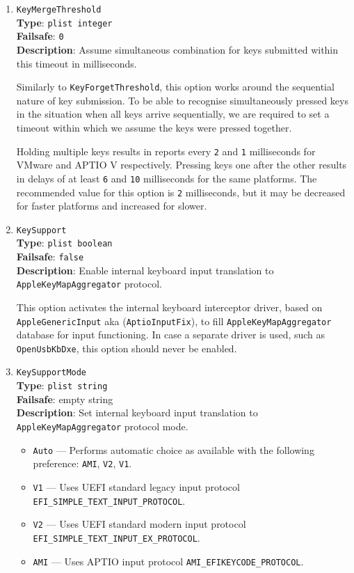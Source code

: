 \documentclass[]{article}
\providecommand{\tightlist}{%
  \setlength{\itemsep}{0pt}\setlength{\parskip}{0pt}}
\begin{document}
\begin{enumerate}
\item
  \texttt{KeyMergeThreshold}\\
  \textbf{Type}: \texttt{plist\ integer}\\
  \textbf{Failsafe}: \texttt{0}\\
  \textbf{Description}: Assume simultaneous combination for keys submitted within
  this timeout in milliseconds.

  Similarly to \texttt{KeyForgetThreshold}, this option works around the sequential
  nature of key submission. To be able to recognise simultaneously pressed keys
  in the situation when all keys arrive sequentially, we are required to set
  a timeout within which we assume the keys were pressed together.

  Holding multiple keys results in reports every \texttt{2} and \texttt{1} milliseconds
  for VMware and APTIO V respectively. Pressing keys one after the other results in
  delays of at least \texttt{6} and \texttt{10} milliseconds for the same platforms.
  The recommended value for this option is \texttt{2} milliseconds, but it may be
  decreased for faster platforms and increased for slower.

\item
  \texttt{KeySupport}\\
  \textbf{Type}: \texttt{plist\ boolean}\\
  \textbf{Failsafe}: \texttt{false}\\
  \textbf{Description}: Enable internal keyboard input translation to
  \texttt{AppleKeyMapAggregator} protocol.

  This option activates the internal keyboard interceptor driver, based on
  \texttt{AppleGenericInput} aka (\texttt{AptioInputFix}), to fill
  \texttt{AppleKeyMapAggregator} database for input functioning. In case
  a separate driver is used, such as \texttt{OpenUsbKbDxe}, this option
  should never be enabled.

\item
  \texttt{KeySupportMode}\\
  \textbf{Type}: \texttt{plist\ string}\\
  \textbf{Failsafe}: empty string\\
  \textbf{Description}: Set internal keyboard input translation to
  \texttt{AppleKeyMapAggregator} protocol mode.

  \begin{itemize}
  \tightlist
  \item \texttt{Auto} --- Performs automatic choice as available with the following preference: \texttt{AMI}, \texttt{V2}, \texttt{V1}.
  \item \texttt{V1} --- Uses UEFI standard legacy input protocol \texttt{EFI\_SIMPLE\_TEXT\_INPUT\_PROTOCOL}.
  \item \texttt{V2} --- Uses UEFI standard modern input protocol \texttt{EFI\_SIMPLE\_TEXT\_INPUT\_EX\_PROTOCOL}.
  \item \texttt{AMI} --- Uses APTIO input protocol \texttt{AMI\_EFIKEYCODE\_PROTOCOL}.
  \end{itemize}


\end{enumerate}
\end{document}
